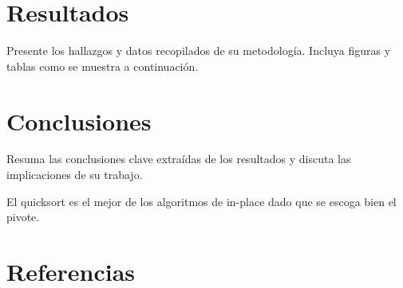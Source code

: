 \documentclass[conference]{IEEEtran}
\begin{document}
\section{Resultados}
Presente los hallazgos y datos recopilados de su metodología. Incluya figuras y tablas como se muestra a continuación.


\section{Conclusiones}
Resuma las conclusiones clave extraídas de los resultados y discuta las implicaciones de su trabajo.

El quicksort es el mejor de los algoritmos de in-place dado que se escoga bien el pivote.

\section*{Referencias}


\end{document}
